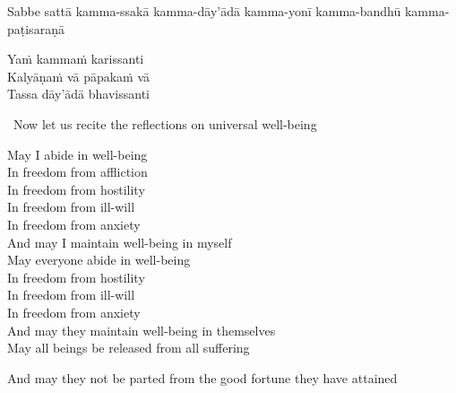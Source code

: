 \bigskip

\begin{pali-hang-together}
  Sabbe sattā kamma-ssakā kamma-dāy'ādā kamma-yonī kamma-bandhū kamma-paṭisaraṇā\\
\end{pali-hang-together}
Yaṁ kammaṁ karissanti\\
Kalyāṇaṁ vā pāpakaṁ vā\\
Tassa dāy'ādā bhavissanti

\clearpage

\begin{leader-english}
  \anglebracketleft\ \hspace{-0.5mm}Now let us recite the reflections on universal well-being \hspace{-0.5mm}\anglebracketright\
\end{leader-english}

\begin{english-verses}
  May I abide in well-being\\
  In freedom from affliction\\
  In freedom from hostility\\
  In freedom from ill-will\\
  In freedom from anxiety\\
  And may I maintain well-being in myself\\
  May everyone abide in well-being\\
  In freedom from hostility\\
  In freedom from ill-will\\
  In freedom from anxiety\\
  And may they maintain well-being in themselves\\
  May all beings be released from all suffering\\
  \begin{english-hang-together}
    And may they not be parted from the good fortune they have attained\makeatletter\hyperlink{endnote95-appendix}\makeatother
  \end{english-hang-together}
\end{english-verses}


